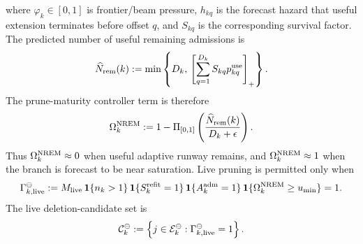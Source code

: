 \documentclass[
  reprint,
  amsmath,
  amssymb,
  aps,
  pra,
  nofootinbib,
  superscriptaddress,
  floatfix
]{revtex4-2}
\begin{document}
where \(\varphi_k\in[0,1]\) is frontier/beam pressure, \(h_{kq}\) is the forecast hazard that useful extension terminates before offset \(q\), and \(S_{kq}\) is the corresponding survival factor.  The predicted number of useful remaining admissions is
\[
\widehat N_{\rm rem}(k)
:=
\min\left\{
D_k,\,
\left[
\sum_{q=1}^{D_k}S_{kq}p_{kq}^{\rm use}
\right]_+
\right\}.
\]
The prune-maturity controller term is therefore
\[
\Omega_k^{\rm NREM}
:=
1-
\Pi_{[0,1]}
\left(
\frac{\widehat N_{\rm rem}(k)}
{D_k+\epsilon}
\right).
\]
Thus \(\Omega_k^{\rm NREM}\approx0\) when useful adaptive runway remains, and \(\Omega_k^{\rm NREM}\approx1\) when the branch is forecast to be near saturation.  Live pruning is permitted only when
\[
\Gamma_{k,{\rm live}}^\ominus
:=
M_{\rm live}\,
\mathbf 1\{n_k>1\}\,
\mathbf 1\{S_k^{\rm refit}=1\}\,
\mathbf 1\{A_k^{\rm adm}=1\}\,
\mathbf 1\{\Omega_k^{\rm NREM}\ge u_{\min}\}
=1 .
\]
The live deletion-candidate set is
\[
\mathcal C_k^\ominus
:=
\left\{
j\in\mathcal E_k^\ominus:
\Gamma_{k,{\rm live}}^\ominus=1
\right\}.
\]
\end{document}
